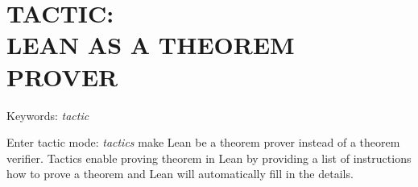 \chapter{TACTIC: \\ LEAN AS A THEOREM PROVER}

Keywords: \textit{tactic}

Enter tactic mode: \textit{tactics} make Lean be a theorem prover instead of a theorem verifier. Tactics enable proving theorem in Lean by providing a list of instructions how to prove a theorem and Lean will automatically fill in the details.
